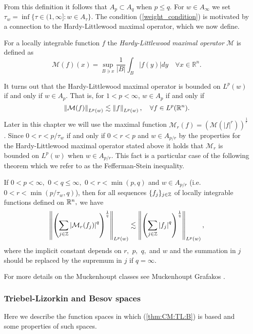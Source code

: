 From this definition it follows that $A_p \subset A_q$ when $p\leq q$. 
For $w\in A_\infty$ we set 
$\tau_w = \inf\{\tau \in (1,\infty]: w\in A_\tau \}$. 
The condition (\ref{weight_condition}) is motivated by a connection to the Hardy-Littlewood maximal operator, which we now define.
\begin{dfn}
For a locally integrable function $f$ the \textit{Hardy-Littlewood maximal operator} $\mathcal{M}$ is defined as 
\[ \mathcal{M}(f)(x)  = \sup_{B \ni x} \frac{1}{|B|}\int_B |f(y)|dy \quad \forall x\in\mathbb{R}^n. \]
\end{dfn}
It turns out that the Hardy-Littlewood maximal operator is bounded on $L^p(w)$ if and only if $w\in A_p$. That is, for $1<p<\infty$, $w\in A_p$ if and only if 
\[\left\|\mathcal{M}(f)\right\|_{L^p (w)} \lesssim \left\|f\right\|_{L^p (w)}, \quad \forall f\in L^p({{\mathbb R}^n}). \]
Later in this chapter we will use the maximal function $\mathcal{M}_r (f) = \left(\mathcal{M}(|f|^r)\right)^{\frac{1}{r}}$. Since $0<r<p/\tau_w$ if and only if $0<r<p$ and $w\in A_{p/r}$ by the properties for the Hardy-Littlewood maximal operator stated above it holds that $\mathcal{M}_r$ is bounded on $L^p (w)$ when $w\in A_{p/r}$. This fact is a particular case of the following theorem which we refer to as the Fefferman-Stein inequality.

\begin{theorem}
If $0<p<\infty,$ $0<q\le \infty,$  $0<r <\min(p,q)$ and $w \in A_{p/r}$ (i.e. $0<r<\min(p/\tau_w,q)$), then for all sequences $\{f_{j}\}_{j\in\mathbb{Z}}$ of locally integrable functions defined on ${{\mathbb R}^n},$ we have
 \begin{equation*}
 \left\|\left(\sum_{j\in\mathbb{Z}}\left\vert \mathcal{M}_r (f_j) \right\vert^q\right)^{\frac{1}{q}}\right\|_{L^{p}(w)}\lesssim
 \left\|\left(\sum_{j\in\mathbb{Z}}\left\vert f_j \right\vert^q\right)^{\frac{1}{q}}\right\|_{L^{p}(w)},\label{eq:wFS}
 \end{equation*}
where the implicit constant depends on $r,$ $p,$ $q,$ and $w$ and the summation in $j$ should be replaced by the supremum in $j$ if $q=\infty.$
\end{theorem}
For more details on the Muckenhoupt classes see Muckenhoupt \cite{MR0293384} Grafakos \cite{MR3243741}.

\subsubsection{Triebel-Lizorkin and Besov spaces}\label{TL_B_section}
Here we describe the function spaces in which (\ref{thm:CM:TL:B}) is based and some properties of such spaces. 

